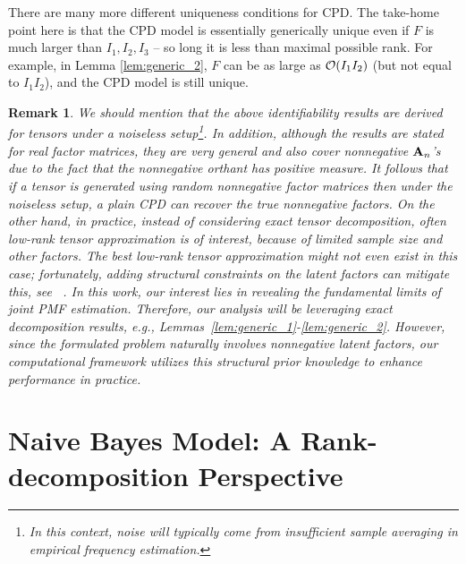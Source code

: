 \documentclass[journal]{IEEEtran}
\newtheorem{Remark}{Remark}
\begin{document}
There are many more different uniqueness conditions for {CPD}. The take-home point here is that the CPD model is essentially generically unique even if $F$ is much larger than $I_1,I_2,I_3$ -- so long it is less than maximal possible rank.
For example, in Lemma \ref{lem:generic_2}, $F$ can be as large as ${\cal O}(I_1I_2)$ (but not equal to $I_1 I_2$), and the CPD model is still unique. 


\begin{Remark}
{\rm
{ We should mention that the above identifiability results are derived for tensors under a noiseless setup\footnote{In this context, noise will typically come from insufficient sample averaging in empirical frequency estimation.}. In addition, although the results are stated for real factor matrices, they are very general and also cover nonnegative ${\bf A}_n$'s due to the fact that the nonnegative orthant has positive measure. It follows that if a tensor is generated using random nonnegative factor matrices then under the noiseless setup, a plain CPD can recover the true nonnegative factors. On the other hand, in practice, instead of considering {\it exact} tensor decomposition, often {\it low-rank tensor approximation} is of interest, because of limited sample size and other factors. The best low-rank tensor approximation might not even exist in this case; fortunately, adding structural constraints on the latent factors can mitigate this, see ~\cite{QiCoLim2016}. In this work, our interest lies in revealing the fundamental limits of joint PMF estimation. Therefore, our analysis will be leveraging exact decomposition results, e.g., Lemmas~\ref{lem:generic_1}-\ref{lem:generic_2}. However, since the formulated problem naturally involves nonnegative latent factors, our computational framework utilizes this structural prior knowledge to enhance performance in practice.}}
\end{Remark}


\section{Naive Bayes Model: A Rank-decomposition Perspective}\label{sec:connection}
\end{document}

